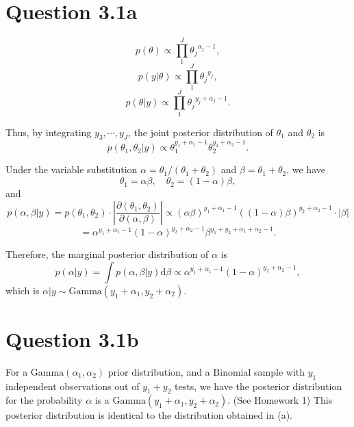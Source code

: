 \documentclass{article}
\begin{document}
\section*{Question 3.1a}
{
    $$p(\theta) \propto \prod_1^J {{\theta_j}^{\alpha_j-1}},$$
    $$p(y|\theta) \propto \prod_1^J {{\theta_j}^{y_j}},$$
    $$p(\theta|y) \propto \prod_1^J {{\theta_j}^{y_j+\alpha_j-1}}.$$

    Thus, by integrating $y_3, \cdots, y_J$, the joint posterior distribution of $\theta_1$ and $\theta_2$ is $$p(\theta_1, \theta_2 | y) \propto \theta_1^{y_1+\alpha_1-1} \theta_2^{y_2+\alpha_2-1}.$$

    Under the variable substitution $\alpha = \theta_1 / (\theta_1+\theta_2)$ and $\beta = \theta_1 + \theta_2$, we have $$\theta_1 = \alpha \beta, \quad \theta_2 = (1-\alpha) \beta,$$ and
    $$p(\alpha, \beta | y) = p(\theta_1, \theta_2) \cdot \left| \frac{\partial (\theta_1, \theta_2)}{\partial (\alpha, \beta)} \right| \propto (\alpha \beta)^{y_1+\alpha_1-1} \left((1-\alpha) \beta\right)^{y_2+\alpha_2-1} \cdot \left| \beta \right| $$
    $$= \alpha^{y_1+\alpha_1-1} (1-\alpha)^{y_2+\alpha_2-1} \beta^{y_1+y_2+\alpha_1+\alpha_2-1}.$$

    Therefore, the marginal posterior distribution of $\alpha$ is $$p(\alpha|y) = \int {p(\alpha, \beta | y) \mathrm{d}\beta} \propto \alpha^{y_1+\alpha_1-1} (1-\alpha)^{y_2+\alpha_2-1},$$ which is $\alpha|y \sim \mathrm{Gamma}(y_1+\alpha_1, y_2+\alpha_2).$
}

\section*{Question 3.1b}
{
    For a $\mathrm{Gamma}(\alpha_1, \alpha_2)$ prior distribution, and a $\mathrm{Binomial}$ sample with $y_1$ independent observations out of $y_1+y_2$ tests, we have the posterior distribution for the probability $\alpha$ is a $\mathrm{Gamma}(y_1+\alpha_1, y_2+\alpha_2)$. (See Homework 1) This posterior distribution is identical to the distribution obtained in (a).
}
\end{document}
